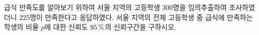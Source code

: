 급식 만족도를 알아보기 위하여 서울 지역의 고등학생 \mbox{$300$명을} 임의추출하여 조사하였더니 $225$명이 만족한다고 응답하였다. 서울 지역의 전체 고등학생 중 급식에 만족하는 학생의 비율 $p$에 대한 신뢰도 $95\mkern3mu \%$의 신뢰구간을 구하시오. 
